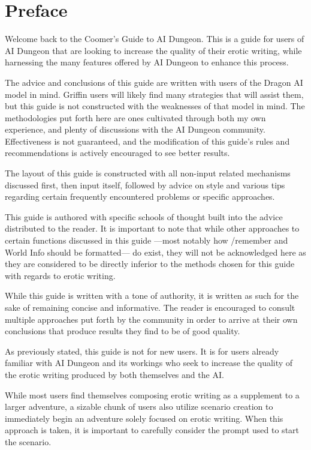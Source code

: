 \documentclass[Source-main.tex]{subfiles}
\begin{document}
\chapter*{Preface}

Welcome back to the Coomer’s Guide to AI Dungeon.
This is a guide for users of AI Dungeon that are looking to increase the quality of their erotic writing, while harnessing the many features offered by AI Dungeon to enhance this process.

The advice and conclusions of this guide are written with users of the Dragon AI model in mind.
Griffin users will likely find many strategies that will assist them, but this guide is not constructed with the weaknesses of that model in mind.
The methodologies put forth here are ones cultivated through both my own experience, and plenty of discussions with the AI Dungeon community.
Effectiveness is not guaranteed, and the modification of this guide’s rules and recommendations is actively encouraged to see better results.


The layout of this guide is constructed with all non-input related mechanisms discussed first, then input itself, followed by advice on style and various tips regarding certain frequently encountered problems or specific approaches.

This guide is authored with specific schools of thought built into the advice distributed to the reader.
It is important to note that while other approaches to certain functions discussed in this guide —most notably how /remember and World Info should be formatted— do exist, they will not be acknowledged here as they are considered to be directly inferior to the methods chosen for this guide with regards to erotic writing.

While this guide is written with a tone of authority, it is written as such for the sake of remaining concise and informative.
The reader is encouraged to consult multiple approaches put forth by the community in order to arrive at their own conclusions that produce results they find to be of good quality.

As previously stated, this guide is not for new users.
It is for users already familiar with AI Dungeon and its workings who seek to increase the quality of the erotic writing produced by both themselves and the AI.


While most users find themselves composing erotic writing as a supplement to a larger adventure, a sizable chunk of users also utilize scenario creation to immediately begin an adventure solely focused on erotic writing.
When this approach is taken, it is important to carefully consider the prompt used to start the scenario.
\end{document}
